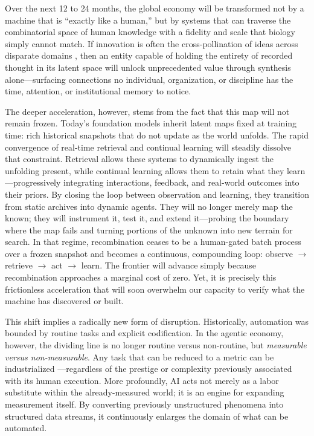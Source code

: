 \documentclass[12pt, letter]{article}
\begin{document}
Over the next 12 to 24 months, the global economy will be transformed not by a machine that is ``exactly like a human,'' but by systems that can traverse the combinatorial space of human knowledge with a fidelity and scale that biology simply cannot match. If innovation is often the cross-pollination of ideas across disparate domains \citep{Jacobs1961}, then an entity capable of holding the entirety of recorded thought in its latent space will unlock unprecedented value through synthesis alone—surfacing connections no individual, organization, or discipline has the time, attention, or institutional memory to notice.

The deeper acceleration, however, stems from the fact that this map will not remain frozen. Today's foundation models inherit latent maps fixed at training time: rich historical snapshots that do not update as the world unfolds. The rapid convergence of real-time retrieval and continual learning will steadily dissolve that constraint. Retrieval allows these systems to dynamically ingest the unfolding present, while continual learning allows them to retain what they learn—progressively integrating interactions, feedback, and real-world outcomes into their priors. By closing the loop between observation and learning, they transition from static archives into dynamic agents. They will no longer merely map the known; they will instrument it, test it, and extend it—probing the boundary where the map fails and turning portions of the unknown into new terrain for search. In that regime, recombination ceases to be a human-gated batch process over a frozen snapshot and becomes a continuous, compounding loop: observe $\rightarrow$ retrieve $\rightarrow$ act $\rightarrow$ learn. The frontier will advance simply because recombination approaches a marginal cost of zero. Yet, it is precisely this frictionless acceleration that will soon overwhelm our capacity to verify what the machine has discovered or built.

This shift implies a radically new form of disruption. Historically, automation was bounded by routine tasks and explicit codification. In the agentic economy, however, the dividing line is no longer routine versus non-routine, but \emph{measurable versus non-measurable}. Any task that can be reduced to a metric can be industrialized \citep{Catalini2025}—regardless of the prestige or complexity previously associated with its human execution. More profoundly, AI acts not merely as a labor substitute within the already-measured world; it is an engine for expanding measurement itself. By converting previously unstructured phenomena into structured data streams, it continuously enlarges the domain of what can be automated.
\end{document}
